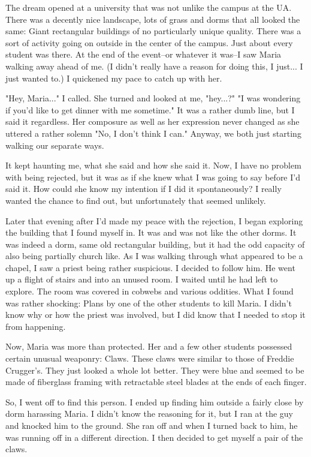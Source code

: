 The dream opened at a university that was not unlike the campus at the UA.  There was a decently nice landscape, lots of grass and dorms that all looked the same:  Giant rectangular buildings of no particularly unique quality.  There was a sort of activity going on outside in the center of the campus.  Just about every student was there.  At the end of the event--or whatever it was--I saw Maria walking away ahead of me. (I didn't really have a reason for doing this, I just... I just wanted to.) I quickened my pace to catch up with her.

  "Hey, Maria..." I called.
She turned and looked at me, "hey...?"
  "I was wondering if you'd like to get dinner with me sometime."
It was a rather dumb line, but I said it regardless.  Her composure as well as her expression never changed as she uttered a rather solemn "No, I don't think I can."
Anyway, we both just starting walking our separate ways.

It kept haunting me, what she said and how she said it.  Now, I have no problem with being rejected, but it was as if she knew what I was going to say before I'd said it.  How could she know my intention if I did it spontaneously?  I really wanted the chance to find out, but unfortunately that seemed unlikely.

Later that evening after I'd made my peace with the rejection, I began exploring the building that I found myself in.  It was and was not like the other dorms.  It was indeed a dorm, same old rectangular building, but it had the odd capacity of also being partially church like.  As I was walking through what appeared to be a chapel, I saw a priest being rather suspicious.  I decided to follow him.  He went up a flight of stairs and into an unused room.  I waited until he had left to explore.  The room was covered in cobwebs and various oddities.  What I found was rather shocking:  Plans by one of the other students to kill Maria.  I didn't know why or how the priest was involved, but I did know that I needed to stop it from happening.

Now, Maria was more than protected.  Her and a few other students possessed certain unusual weaponry:  Claws.  These claws were similar to those of Freddie Crugger's.  They just looked a whole lot better.  They were blue and seemed to be made of fiberglass framing with retractable steel blades at the ends of each finger.

So, I went off to find this person.  I ended up finding him outside a fairly close by dorm harassing Maria.  I didn't know the reasoning for it, but I ran at the guy and knocked him to the ground. She ran off and when I turned back to him, he was running off in a different direction.  I then decided to get myself a pair of the claws.

